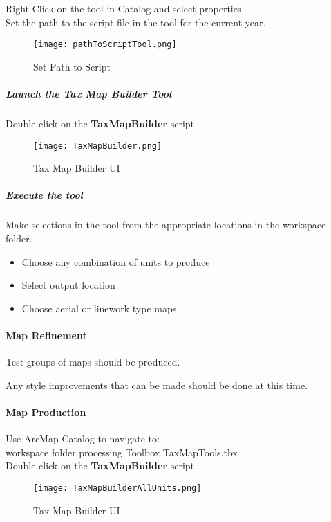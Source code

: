 \noindent Right Click on the tool in Catalog and select properties.\\
Set the path to the script file in the tool for the current year.


\begin{figure}[h!]
 \centering
     \texttt{[image: pathToScriptTool.png]}
 \caption{Set Path to Script}
 \end{figure}

\clearpage

\subparagraph{Launch the Tax Map Builder Tool}
Double click on the \textbf{TaxMapBuilder} script

\begin{figure}[h!]
 \centering
     \texttt{[image: TaxMapBuilder.png]}
 \caption{Tax Map Builder UI}
 \end{figure}


\subparagraph{Execute the tool}

\noindent Make selections in the tool from the appropriate locations in the workspace folder.

\begin{itemize}
\item Choose any combination of units to produce
\item Select output location
\item Choose aerial or linework type maps
\end{itemize}
\clearpage
\paragraph{Map Refinement}Test groups of maps should be produced.  

\noindent Any style improvements that can be made should be done at this time.

\paragraph{Map Production}

Use ArcMap Catalog to navigate to:\\
workspace folder{\menuArrow} processing {\menuArrow} Toolbox {\menuArrow} TaxMapTools.tbx\\
Double click on the \textbf{TaxMapBuilder} script
\begin{figure}[h!]
 \centering
     \texttt{[image: TaxMapBuilderAllUnits.png]}
 \caption{Tax Map Builder UI}
 \end{figure}

